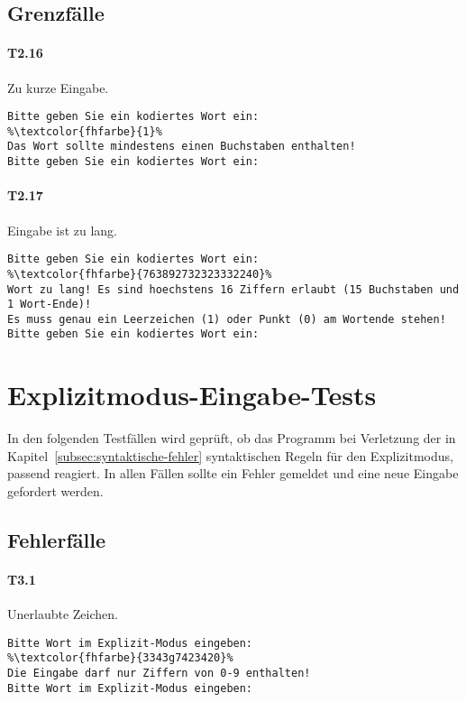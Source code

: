 \subsection*{Grenzfälle}\label{subsec:normalmodus-grenzfaelle}

\paragraph*{T2.16} Zu kurze Eingabe.
\begin{lstlisting}[escapechar=\%]
Bitte geben Sie ein kodiertes Wort ein:
%\textcolor{fhfarbe}{1}%
Das Wort sollte mindestens einen Buchstaben enthalten!
Bitte geben Sie ein kodiertes Wort ein:
\end{lstlisting}

\paragraph*{T2.17} Eingabe ist zu lang.
\begin{lstlisting}[escapechar=\%]
Bitte geben Sie ein kodiertes Wort ein:
%\textcolor{fhfarbe}{763892732323332240}%
Wort zu lang! Es sind hoechstens 16 Ziffern erlaubt (15 Buchstaben und 1 Wort-Ende)!
Es muss genau ein Leerzeichen (1) oder Punkt (0) am Wortende stehen!
Bitte geben Sie ein kodiertes Wort ein:
\end{lstlisting}


\section{Explizitmodus-Eingabe-Tests}\label{sec:explizitmodus-tests}

In den folgenden Testfällen wird geprüft, ob das Programm bei Verletzung der in Kapitel~\ref{subsec:syntaktische-fehler} syntaktischen Regeln für den Explizitmodus, passend reagiert.
In allen Fällen sollte ein Fehler gemeldet und eine neue Eingabe gefordert werden.

\subsection*{Fehlerfälle}\label{subsec:explizit-fehlerfaelle}

\paragraph*{T3.1} Unerlaubte Zeichen.
\begin{lstlisting}[escapechar=\%]
Bitte Wort im Explizit-Modus eingeben:
%\textcolor{fhfarbe}{3343g7423420}%
Die Eingabe darf nur Ziffern von 0-9 enthalten!
Bitte Wort im Explizit-Modus eingeben:
\end{lstlisting}

